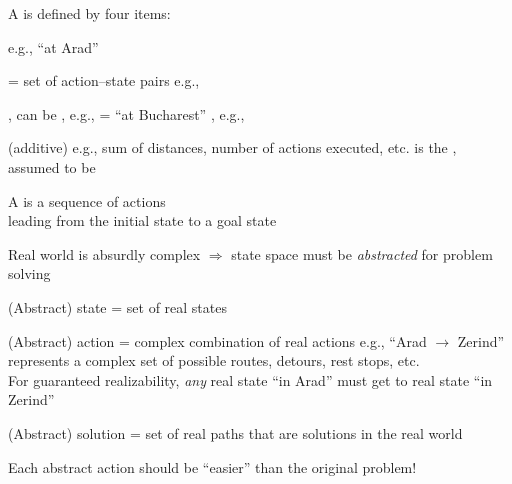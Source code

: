 \documentclass{article}
\begin{document}
\begin{huge}

A  is defined by four items:

 \quad e.g., ``at Arad''

  = set of action--state pairs \nl
e.g., 

, can be\nl
{}, e.g.,  = ``at Bucharest''\nl
{}, e.g., 

 (additive)\nl
e.g., sum of distances, number of actions executed, etc.\nl
{} is the , assumed to be 

A  is a sequence of actions\\
leading from the initial state to a goal state


Real world is absurdly complex \nl
$\Rightarrow$ state space must be \emph{abstracted} for problem solving

(Abstract) state = set of real states

(Abstract) action = complex combination of real actions\nl
   e.g., ``Arad $\rightarrow$ Zerind'' represents a complex set\nnl
   of possible routes, detours, rest stops, etc. \\
For guaranteed realizability, \emph{any} real state ``in Arad''\al
must get to  real state ``in Zerind''

(Abstract) solution = \nl
   set of real paths that are solutions in the real world

Each abstract action should be ``easier'' than the original problem!




\textwidth
{}

\\
\\
\\




\end{huge}
\end{document}
